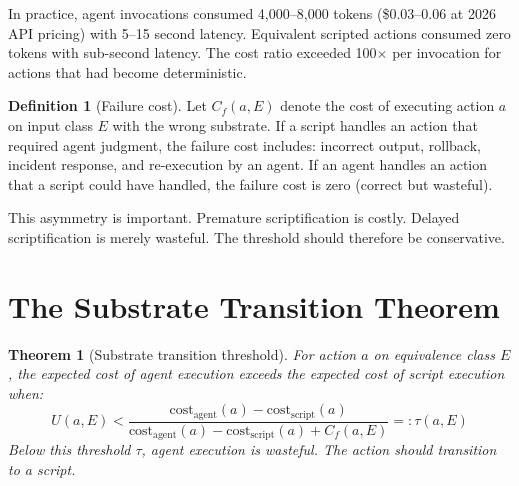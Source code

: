 \documentclass[11pt]{article}
\newtheorem{theorem}{Theorem}
\theoremstyle{definition}
\newtheorem{definition}{Definition}
\begin{document}
In practice, agent invocations consumed 4{,}000--8{,}000 tokens
(\$0.03--0.06 at 2026 API pricing) with 5--15 second latency.
Equivalent scripted actions consumed zero tokens with sub-second
latency. The cost ratio exceeded 100$\times$ per invocation for
actions that had become deterministic.

\begin{definition}[Failure cost]
\label{def:failure-cost}
Let $C_f(a, E)$ denote the cost of executing action $a$ on input class
$E$ with the wrong substrate. If a script handles an action that
required agent judgment, the failure cost includes: incorrect output,
rollback, incident response, and re-execution by an agent. If an agent
handles an action that a script could have handled, the failure cost is
zero (correct but wasteful).
\end{definition}

This asymmetry is important. Premature scriptification is costly.
Delayed scriptification is merely wasteful. The threshold should
therefore be conservative.

\section{The Substrate Transition Theorem}
\label{sec:theorem}

\begin{theorem}[Substrate transition threshold]
\label{thm:substrate}
For action $a$ on equivalence class $E$, the expected cost of agent
execution exceeds the expected cost of script execution when:
\[
U(a, E) < \frac{\text{cost}_{\text{agent}}(a) -
\text{cost}_{\text{script}}(a)}{\text{cost}_{\text{agent}}(a) -
\text{cost}_{\text{script}}(a) + C_f(a, E)}
=: \tau(a, E)
\]
Below this threshold $\tau$, agent execution is wasteful. The action
should transition to a script.
\end{theorem}
\end{document}
